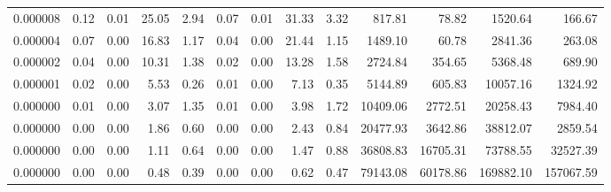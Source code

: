 \begin{tabular}{lrrrrrrrrrrrr}
0.000008 & 0.12 & 0.01 & 25.05 & 2.94 & 0.07 & 0.01 & 31.33 & 3.32 & 817.81 & 78.82 & 1520.64 & 166.67 \\
0.000004 & 0.07 & 0.00 & 16.83 & 1.17 & 0.04 & 0.00 & 21.44 & 1.15 & 1489.10 & 60.78 & 2841.36 & 263.08 \\
0.000002 & 0.04 & 0.00 & 10.31 & 1.38 & 0.02 & 0.00 & 13.28 & 1.58 & 2724.84 & 354.65 & 5368.48 & 689.90 \\
0.000001 & 0.02 & 0.00 & 5.53 & 0.26 & 0.01 & 0.00 & 7.13 & 0.35 & 5144.89 & 605.83 & 10057.16 & 1324.92 \\
0.000000 & 0.01 & 0.00 & 3.07 & 1.35 & 0.01 & 0.00 & 3.98 & 1.72 & 10409.06 & 2772.51 & 20258.43 & 7984.40 \\
0.000000 & 0.00 & 0.00 & 1.86 & 0.60 & 0.00 & 0.00 & 2.43 & 0.84 & 20477.93 & 3642.86 & 38812.07 & 2859.54 \\
0.000000 & 0.00 & 0.00 & 1.11 & 0.64 & 0.00 & 0.00 & 1.47 & 0.88 & 36808.83 & 16705.31 & 73788.55 & 32527.39 \\
0.000000 & 0.00 & 0.00 & 0.48 & 0.39 & 0.00 & 0.00 & 0.62 & 0.47 & 79143.08 & 60178.86 & 169882.10 & 157067.59 \\
\bottomrule
\end{tabular}
